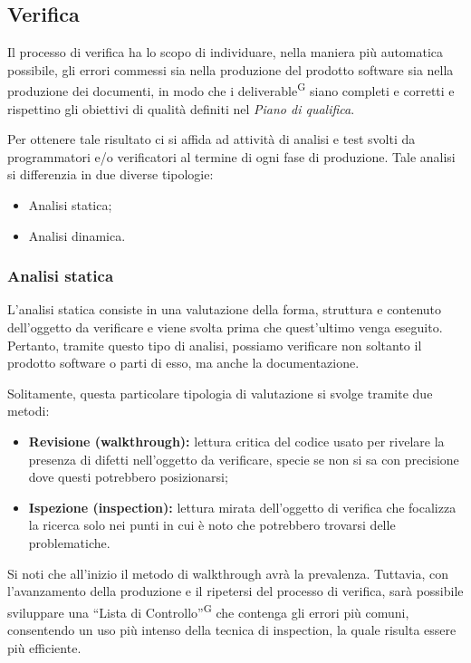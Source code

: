 \subsection{Verifica}\label{sec:processi_di_supporto:verifica}
Il processo di verifica ha lo scopo di individuare, nella maniera più automatica possibile, gli errori commessi sia nella produzione del prodotto software sia nella produzione dei documenti, in modo che i deliverable\textsuperscript{G} siano completi e corretti e rispettino gli obiettivi di qualità definiti nel \textit{Piano di qualifica}.

Per ottenere tale risultato ci si affida ad attività di analisi e test svolti da programmatori e/o verificatori al termine di ogni fase di produzione. Tale analisi si differenzia in due diverse tipologie:
\begin{itemize}
    \item Analisi statica;
    \item Analisi dinamica.
\end{itemize}

\subsubsection{Analisi statica}
L'analisi statica consiste in una valutazione della forma, struttura e contenuto dell'oggetto da verificare e viene svolta prima che quest'ultimo venga eseguito. Pertanto, tramite questo tipo di analisi, possiamo verificare non soltanto il prodotto software o parti di esso, ma anche la documentazione.

Solitamente, questa particolare tipologia di valutazione si svolge tramite due metodi:
\begin{itemize}
    \item \textbf{Revisione (walkthrough):} lettura critica del codice usato per rivelare la presenza di difetti nell'oggetto da verificare, specie se non si sa con precisione dove questi potrebbero posizionarsi;
    \item \textbf{Ispezione (inspection):} lettura mirata dell’oggetto di verifica che focalizza la ricerca solo nei punti in cui è noto che potrebbero trovarsi delle problematiche.
\end{itemize}
Si noti che all'inizio il metodo di walkthrough avrà la prevalenza. Tuttavia, con l'avanzamento della produzione e il ripetersi del processo di verifica, sarà possibile sviluppare una ``Lista di Controllo''\textsuperscript{G} che contenga gli errori più comuni, consentendo un uso più intenso della tecnica di inspection, la quale risulta essere più efficiente.

